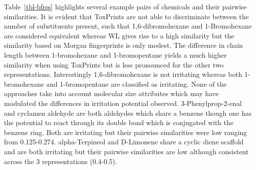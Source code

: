 \documentclass[
  super,
  preprint,
  3p]{elsarticle}
\begin{document}
Table~\ref{tbl-bfrss} highlights several example pairs of chemicals and
their pairwise similarities. It is evident that ToxPrints are not able
to discriminate between the number of substituents present, such that
1,6-dibromohexane and 1-Bromohexane are considered equivalent whereas WL
gives rise to a high similarity but the similarity based on Morgan
fingerprints is only modest. The difference in chain length between
1-bromohexane and 1-bromopentane yields a much higher similarity when
using ToxPrints but is less pronounced for the other two
representations. Interestingly 1,6-dibromohexane is not irritating
whereas both 1-bromohexane and 1-bromopentane are classified as
irritating. None of the approaches take into account molecular size
attributes which may have modulated the differences in irritation
potential observed. 3-Phenylprop-2-enal and cyclamen aldehyde are both
aldehydes which share a benzene though one has the potential to react
through its double bond which is conjugated with the benzene ring. Both
are irritating but their pairwise similarities were low ranging from
0.125-0.274. alpha-Terpineol and D-Limonene share a cyclic diene
scaffold and are both irritating but their pairwise similarities are low
although consistent across the 3 representations (0.4-0.5).
\end{document}
